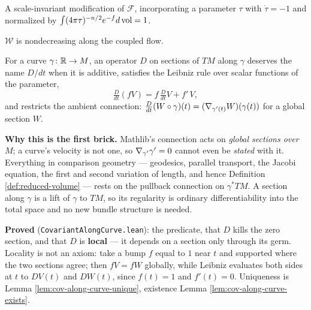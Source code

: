 \begin{definition}
  \label{def:w-entropy}
  A scale-invariant modification of $\mathcal{F}$, incorporating a parameter
  $\tau$ with $\dot\tau = -1$ and normalized by
  $\int (4\pi\tau)^{-n/2} e^{-f} d\operatorname{vol} = 1$.
\end{definition}

\begin{theorem}
  \label{thm:w-monotone}
  $\mathcal{W}$ is nondecreasing along the coupled flow.
\end{theorem}

\begin{definition}
  \label{def:cov-along-curve}
  \leanok
  For a curve $\gamma \colon \mathbb{R} \to M$, an operator $D$ on sections of $TM$
  along $\gamma$ deserves the name $D/dt$ when it is additive, satisfies the
  Leibniz rule over scalar functions of the parameter,
  \[
    \tfrac{D}{dt}(fV) = f\,\tfrac{D}{dt}V + f'\,V,
  \]
  and restricts the ambient connection: $\tfrac{D}{dt}(W \circ \gamma)(t) =
  (\nabla_{\gamma'(t)} W)(\gamma(t))$ for a global section $W$.

  \textbf{Why this is the first brick.} Mathlib's connection acts on
  \emph{global sections over $M$}; a curve's velocity is not one, so
  $\nabla_{\gamma'}\gamma' = 0$ cannot even be \emph{stated} with it. Everything
  in comparison geometry --- geodesics, parallel transport, the Jacobi
  equation, the first and second variation of length, and hence Definition
  \ref{def:reduced-volume} --- rests on the pullback connection on
  $\gamma^*TM$. A section along $\gamma$ is a lift of $\gamma$ to $TM$, so its
  regularity is ordinary differentiability into the total space and no new
  bundle structure is needed.

  \textbf{Proved} (\texttt{CovariantAlongCurve.lean}): the predicate, that $D$
  kills the zero section, and that $D$ is \textbf{local} --- it depends on a
  section only through its germ. Locality is not an axiom: take a bump $f$
  equal to $1$ near $t$ and supported where the two sections agree; then $fV =
  fW$ globally, while Leibniz evaluates both sides at $t$ to $DV(t)$ and
  $DW(t)$, since $f(t) = 1$ and $f'(t) = 0$. Uniqueness is Lemma
  \ref{lem:cov-along-curve-unique}, existence Lemma
  \ref{lem:cov-along-curve-exists}.
\end{definition}


